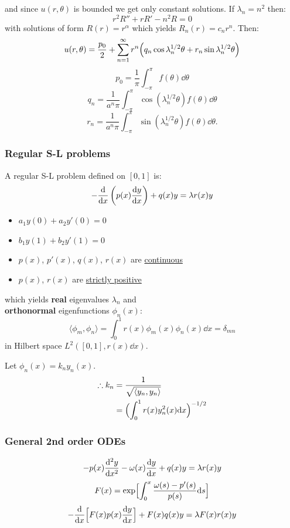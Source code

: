 \documentclass{article}
\begin{document}
\begin{multicols}{3}
\columnbreak

and since $u(r,\theta)$ is bounded we get only constant solutions.
If $\lambda_n=n^2$ then:
$$r^2 R''+rR'-n^2 R=0$$
with solutions of form $R(r)=r^{\alpha}$ which yields
$R_n(r)=c_n r^n$. Then:
$$u(r,\theta)=\frac{p_0}{2}+\sum_{n=1}^{\infty}
r^n\Bigl(q_n\cos\lambda_n^{1/2}\theta
+r_n\sin\lambda_n^{1/2}\theta\Bigr)$$
$$p_0=\frac{1}{\pi}\int_{-\pi}^{\pi}f(\theta)\dd\theta$$
$$q_n=\frac{1}{a^n\pi}\int_{-\pi}^{\pi}
\cos(\lambda_n^{1/2}\theta)f(\theta)\dd\theta$$
$$r_n=\frac{1}{a^n\pi}\int_{-\pi}^{\pi}
\sin(\lambda_n^{1/2}\theta)f(\theta)\dd\theta.$$

\subsubsection*{Regular S-L problems}
A regular S-L problem defined on $[0,1]$ is:
$$-\dv{x}\left(p(x)\dv{y}{x}\right)+q(x)y=\lambda r(x)y$$
\begin{itemize}
    \item $a_1 y(0)+a_2 y'(0)=0$
    \item $b_1 y(1)+b_2 y'(1)=0$
    \item $p(x)$, $p'(x)$, $q(x)$, $r(x)$ are \underline{continuous}
    \item $p(x)$, $r(x)$ are \underline{strictly positive}
\end{itemize}
which yields \textbf{real} eigenvalues $\lambda_n$
and \\ \textbf{orthonormal} eigenfunctions $\phi_n(x)$:
$$\langle \phi_m,\phi_n \rangle
=\int_{0}^{1}r(x)\phi_m(x)\phi_n(x) \dd x=\delta_{mn}$$
in Hilbert space $L^2([0,1],r(x)\dd x)$.

Let $\phi_n(x)=k_n y_n(x)$.
\begin{align*}
    \therefore k_n
    &=\frac{1}{\sqrt{\langle y_n,y_n \rangle}} \\
    &=\Bigl(\int_{0}^{1}r(x)y_n^2(x)\dd x\Bigr)^{-1/2}
\end{align*}

\subsubsection*{General 2nd order ODEs}
$$-p(x)\dv[2]{y}{x}-\omega(x)\dv{y}{x}+q(x)y=\lambda r(x)y$$
$$F(x)=\exp\Bigl[\int_{0}^{x}
\frac{\omega(s)-p'(s)}{p(s)}\dd s\Bigr]$$
$$-\dv{x}\Bigl[F(x)p(x)\dv{y}{x}\Bigr]
+F(x)q(x)y=\lambda F(x)r(x)y$$

\columnbreak


\end{multicols}
\end{document}

